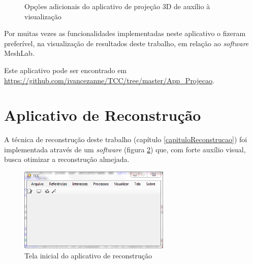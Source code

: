 		\begin{figure}[!htb]
			\centering
			\quad
			\caption{Opções adicionais do aplicativo de projeção 3D de auxílio à visualização}
			\label{imagemApp3DAuxiliosVisuais}
		\end{figure}
		
		Por muitas vezes as funcionalidades implementadas neste aplicativo o fizeram preferível, na visualização de resultados deste trabalho, em relação ao \textit{software} MeshLab.
		
		Este aplicativo pode ser encontrado em \url{https://github.com/ivancezanne/TCC/tree/master/App_Projecao}.
		
	\section{Aplicativo de Reconstrução}
		\label{appReconstrucao}
		
		A técnica de reconstrução deste trabalho (capítulo \ref{capituloReconstrucao}) foi implementada através de um \textit{software} (figura \ref{printAppReconstrucao}) que, com forte auxílio visual, busca otimizar a reconstrução almejada.
		
		\begin{figure}[!htb]
			\centering
			\includegraphics[height=4cm]{imagens/printAppReconstrucao.png}
			\caption{Tela inicial do aplicativo de reconstrução}
			\label{printAppReconstrucao}
		\end{figure}
		
